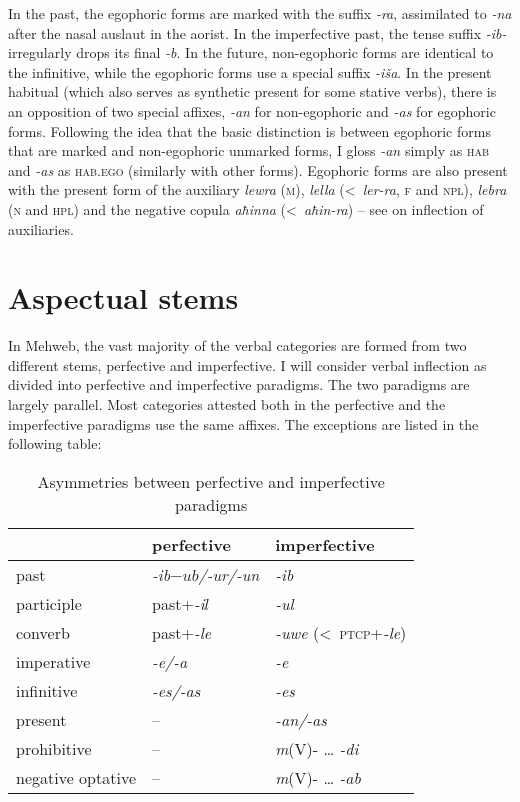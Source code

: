 \documentclass[output=paper]{langsci/langscibook}
\begin{document}
In the past, the egophoric forms are marked with the suffix \emph{-ra},
assimilated to \emph{-na} after the nasal auslaut in the aorist. In the
imperfective past, the tense suffix \emph{-ib-} irregularly drops its
final \emph{-b}. In the future, non-egophoric forms are identical to the
infinitive, while the egophoric forms use a special suffix \emph{-iša}. In
the present habitual (which also serves as synthetic present for some stative verbs), there is an opposition of two special affixes,
\emph{-an} for non-egophoric and \emph{-as} for egophoric forms. Following
the idea that the basic distinction is between egophoric forms that are
marked and non-egophoric unmarked forms, I gloss \mbox{\emph{-an}} simply as
\textsc{hab} and \emph{-as} as \textsc{hab}.\textsc{ego} (similarly
with other forms). Egophoric forms are also present with the present form
of the auxiliary \emph{lewra} (\textsc{m}), \emph{lella}
(\textless{}~\emph{ler-ra}, \textsc{f} and \textsc{npl}),
\emph{lebra}
(\textsc{n} and \textsc{hpl}) and the negative copula \emph{aħinna}
(\textless{}~\emph{aħin-ra}) – see  on inflection of
auxiliaries.

\section{Aspectual stems}\label{aspectual-stems}


In Mehweb, the vast majority of the verbal categories are formed from
two different stems, perfective and imperfective. I will consider verbal
inflection as divided into perfective and imperfective paradigms. The
two paradigms are largely parallel. Most categories attested both in the
perfective and the imperfective paradigms use the same affixes. The
exceptions are listed in the following table:

\begin{table}[h]
  \caption{Asymmetries between perfective and imperfective paradigms}

\begin{tabular}{@{}lll@{}}
\toprule
& perfective & imperfective\tabularnewline \midrule
{past} & \emph{-ib\(-ub\)/-ur/-un} & \emph{-ib}\tabularnewline
participle & {past}+\emph{-i\(l\)} & \emph{-ul}\tabularnewline
converb & {past}+\emph{-le} & \emph{-uwe}
(\textless{}~\textsc{ptcp}+\emph{-le})\tabularnewline
imperative & \emph{-e/-a} & \emph{-e}\tabularnewline
infinitive & \emph{-es/-as} & \emph{-es}\tabularnewline\midrule
present & – & \emph{-an/-as}\tabularnewline
prohibitive & – & \emph{m}(V)- \ldots{} \emph{-di}\tabularnewline
negative optative & – & \emph{m}(V)- \ldots{} \emph{-ab}\tabularnewline
\bottomrule
\end{tabular}
\end{table}
\end{document}

